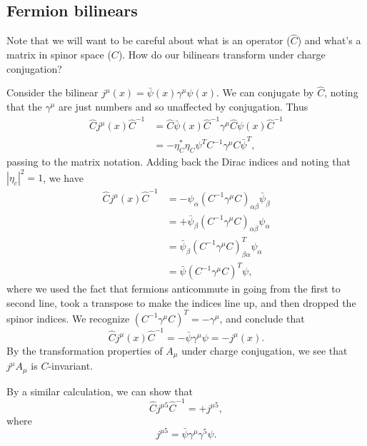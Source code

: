 \subsection*{Fermion bilinears} Note that we will want to be careful about what is an operator ($\hat C$) and what's a matrix in spinor space ($C$). How do our bilinears transform under charge conjugation?
\begin{exm}
    Consider the bilinear $j^\mu(x) = \bar \psi(x) \gamma^\mu \psi(x)$.
    We can conjugate by $\hat C$, noting that the $\gamma^\mu$ are just numbers and so unaffected by conjugation. Thus
    \begin{align*}
        \hat C j^\mu(x)\hat C^{-1} &= \hat C \bar \psi(x) \hat C^{-1} \gamma^\mu \hat C \psi(x) \hat C^{-1}\\
        &= -\eta_C^* \eta_C \psi^T C^{-1} \gamma^\mu C \bar \psi^T,
    \end{align*}
    passing to the matrix notation. Adding back the Dirac indices and noting that $|\eta_c|^2=1$, we have
    \begin{align*}
        \hat C j^\mu(x)\hat C^{-1} &=  -\psi_\alpha (C^{-1} \gamma^\mu C)_{\alpha\beta} \bar \psi_\beta\\
        &= + \bar \psi_\beta ( C^{-1} \gamma^\mu C)_{\alpha \beta} \psi_\alpha\\
        &= \bar \psi_\beta (C^{-1} \gamma^\mu C)^T_{\beta \alpha} \psi_\alpha\\
        &= \bar \psi (C^{-1} \gamma^\mu C)^T \psi,
    \end{align*}
    where we used the fact that fermions anticommute in going from the first to second line, took a transpose to make the indices line up, and then dropped the spinor indices. We recognize $(C^{-1} \gamma^\mu C)^T=-\gamma^\mu$, and conclude that
    \begin{equation}
        \hat C j^\mu(x)\hat C^{-1} = -\bar \psi \gamma^\mu \psi = -j^\mu(x).
    \end{equation}
    By the transformation properties of $A_\mu$ under charge conjugation, we see that $j^\mu A_\mu$ is $C$-invariant.
    
    By a similar calculation, we can show that
    \begin{equation}
        \hat C j^{\mu 5} \hat C^{-1} = + j^{\mu 5},
    \end{equation}
    where
    \begin{equation}
        j^{\mu 5}= \bar \psi \gamma^\mu \gamma^5 \psi.
    \end{equation}
\end{exm}

